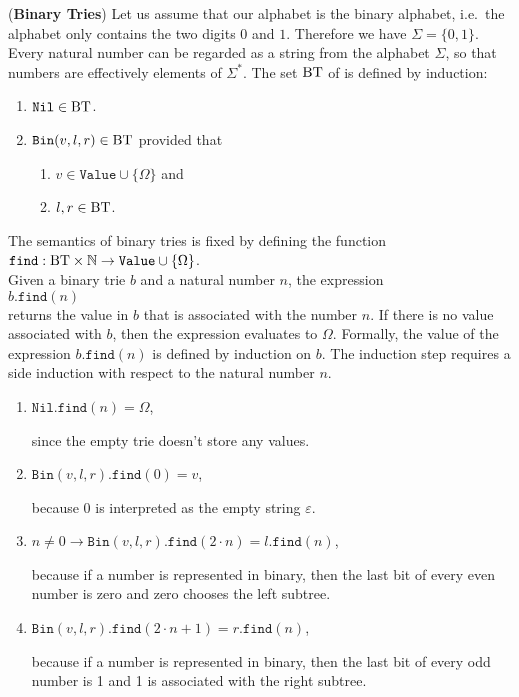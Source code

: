 \exercise
(\textbf{Binary Tries})  Let us assume that our alphabet is the binary alphabet, i.e.~the alphabet
only contains the two digits $0$ and $1$.  Therefore we have $\Sigma = \{0,1\}$.  Every natural
number can be regarded as a string from the alphabet $\Sigma$, so that numbers are effectively
elements of $\Sigma^*$.  The set $\mathrm{BT}$ of  is defined by induction:
\begin{enumerate}
\item $\texttt{Nil} \in \mathrm{BT}$.
\item $\texttt{Bin}(v,l,r) \in \mathrm{BT}$ provided that
      \begin{enumerate}
      \item $v \in \texttt{Value} \cup \{\Omega\}$ \quad and
      \item $l,r \in \mathrm{BT}$.
      \end{enumerate}
\end{enumerate}
The semantics of binary tries is fixed by defining the function
\\[0.2cm]
\hspace*{1.3cm}
$\texttt{find}: \mathrm{BT} \times \mathbb{N} \rightarrow \texttt{Value} \cup \{ \Omega \}$.
\\[0.2cm]
Given a binary trie $b$ and a natural number $n$, the expression
\\[0.2cm]
\hspace*{1.3cm}
$b.\texttt{find}(n)$ 
\\[0.2cm]
returns the value in $b$ that is associated with the number $n$.  If there is no value associated
with $b$, then the expression evaluates to $\Omega$.  Formally, the value of the expression
 $b.\texttt{find}(n)$ is defined by induction on $b$.  The induction step requires a side induction
 with respect to the natural number $n$.
\begin{enumerate}
\item $\texttt{Nil}.\texttt{find}(n) = \Omega$,

      since the empty trie doesn't store any values.
\item $\texttt{Bin}(v,l,r).\texttt{find}(0) = v$,

      because $0$ is interpreted as the empty string $\varepsilon$.
\item $n \not= 0 \rightarrow \texttt{Bin}(v,l,r).\texttt{find}(2\cdot n) = l.\texttt{find}(n)$,

      because if a number is represented in binary, then the last bit of every even number is zero
      and zero chooses the left subtree.
\item $\texttt{Bin}(v,l,r).\texttt{find}(2 \cdot n + 1) = r.\texttt{find}(n)$,

      because if a number is represented in binary, then the last bit of every odd number is 1 and 
      1 is associated with the right subtree.
\end{enumerate}
